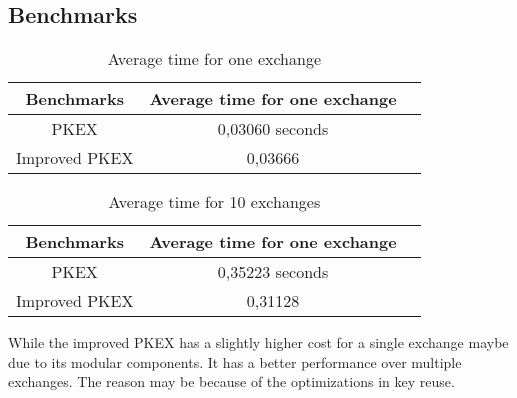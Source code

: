 \subsection{Benchmarks}
\begin{table}[h!]
\centering
\begin{tabular}{|c|c|c|}
\hline
Benchmarks & Average time for one exchange \\ \hline
PKEX   & 0,03060 seconds\\ \hline
Improved PKEX   & 0,03666\\ \hline
\end{tabular}
\caption{Average time for one exchange}
\label{tab:basic}
\end{table}

\begin{table}[h!]
\centering
\begin{tabular}{|c|c|c|}
\hline
Benchmarks & Average time for one exchange \\ \hline
PKEX   & 0,35223 seconds\\ \hline
Improved PKEX   & 0,31128\\ \hline
\end{tabular}
\caption{Average time for 10 exchanges}
\label{tab:basic}
\end{table}

While the improved PKEX has a slightly higher cost for a single exchange maybe
due to its modular components. It has a better performance over multiple
exchanges. The reason may be because of the optimizations in key reuse.
